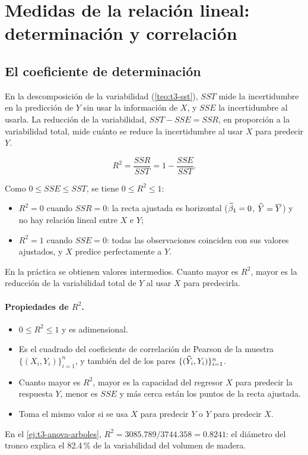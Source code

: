 \section{Medidas de la relación lineal: determinación y correlación}
\label{sec:t3-correlacion}

\subsection{El coeficiente de determinación}

En la descomposición de la variabilidad (\cref{teo:t3-sst}), $SST$ mide la incertidumbre en la
predicción de $Y$ sin usar la información de $X$, y $SSE$ la incertidumbre al usarla. La
reducción de la variabilidad, $SST-SSE=SSR$, en proporción a la variabilidad total, mide cuánto
se reduce la incertidumbre al usar $X$ para predecir $Y$.

\begin{definicion}
  \[
    R^2 = \frac{SSR}{SST} = 1-\frac{SSE}{SST}.
  \]
\end{definicion}

Como $0\le SSE\le SST$, se tiene $0\le R^2\le1$:
\begin{itemize}
  \item $R^2=0$ cuando $SSR=0$: la recta ajustada es horizontal ($\widehat{\beta}_1=0$,
    $\widehat{Y}=\overline{Y}$) y no hay relación lineal entre $X$ e $Y$;
  \item $R^2=1$ cuando $SSE=0$: todas las observaciones coinciden con sus valores ajustados, y
    $X$ predice perfectamente a $Y$.
\end{itemize}
En la práctica se obtienen valores intermedios. Cuanto mayor es $R^2$, mayor es la reducción de
la variabilidad total de $Y$ al usar $X$ para predecirla.

\paragraph{Propiedades de $R^2$.}
\begin{itemize}
  \item $0\le R^2\le1$ y es adimensional.
  \item Es el cuadrado del coeficiente de correlación de Pearson de la muestra
    $\{(X_i,Y_i)\}_{i=1}^n$, y también del de los pares $\{(\widehat{Y}_i,Y_i)\}_{i=1}^n$.
  \item Cuanto mayor es $R^2$, mayor es la capacidad del regresor $X$ para predecir la respuesta
    $Y$, menor es $SSE$ y más cerca están los puntos de la recta ajustada.
  \item Toma el mismo valor si se usa $X$ para predecir $Y$ o $Y$ para predecir $X$.
\end{itemize}
En el \cref{ej:t3-anova-arboles}, $R^2=3085.789/3744.358=0.8241$: el diámetro del tronco explica el
82.4\,\% de la variabilidad del volumen de madera.

